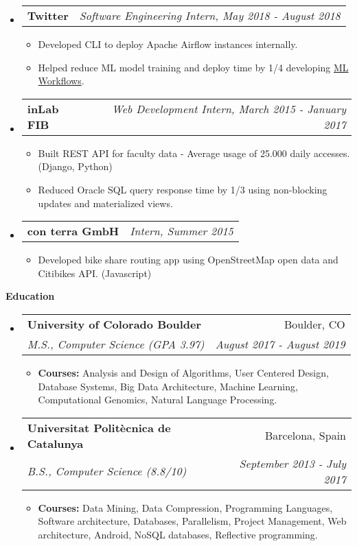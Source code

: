 \documentclass[letterpaper,10pt]{article}
\makeatletter
\newcommand{\resitem}[1]{\item #1 \vspace{-2pt}}
\newcommand{\resheading}[1]{{\large \colorbox{mygrey}{\begin{minipage}{\textwidth}{\textbf{#1 \vphantom{p\^{E}}}}\end{minipage}}}}
\newcommand{\ressubheading}[4]{
\begin{tabular*}{7.0in}{l@{\extracolsep{\fill}}r}
		\textbf{#1} & \textit{#4} \\
\end{tabular*}\vspace{-6pt}}
\newcommand{\ressubheadinged}[4]{
\begin{tabular*}{7.0in}{l@{\extracolsep{\fill}}r}
		\textbf{#1} & #2 \\
		\textit{#3} & \textit{#4}\\
\end{tabular*}\vspace{-6pt}}
\makeatother
\begin{document}
\begin{itemize}
			\item
			\ressubheading{Twitter}{Boulder, CO}{Software Engineering Intern}{Software Engineering Intern, May 2018 - August 2018}
			\begin{itemize}
				\resitem{Developed CLI to deploy Apache Airflow instances internally.}
				\resitem{Helped reduce ML model training and deploy time by 1/4 developing \href{https://blog.twitter.com/engineering/en_us/topics/insights/2018/ml-workflows.html}{ML Workflows}.}
			\end{itemize}
		\item
			\ressubheading{inLab FIB}{Barcelona, Spain}{Web Development Intern}{Web Development Intern, March 2015 - January 2017}
			\begin{itemize}
				\resitem{Built REST API for faculty data - Average usage of 25.000 daily accesses. (Django, Python)}
				\resitem{Reduced Oracle SQL query response time by 1/3 using non-blocking updates and materialized views.}
			\end{itemize}

		\item
			\ressubheading{con terra GmbH}{Münster, Germany}{Intern}{Intern, Summer 2015}
			\begin{itemize}
				\resitem{Developed bike share routing app using OpenStreetMap open data and Citibikes API. (Javascript)}
			\end{itemize}
	\end{itemize}
\break
\resheading{Education}
	\begin{itemize}
		\item
			\ressubheadinged{University of Colorado Boulder}{Boulder, CO}{M.S., Computer Science (GPA 3.97)}{August 2017 - August 2019}
			\begin{itemize}
				\resitem{\textbf{Courses:} Analysis and Design of Algorithms, User Centered Design, Database Systems, Big Data Architecture, Machine Learning, Computational Genomics, Natural Language Processing.}
			\end{itemize}

		\item
			\ressubheadinged{Universitat Polit\`ecnica de Catalunya}{Barcelona, Spain}{B.S., Computer Science (8.8/10)}{September 2013 - July 2017}
			\begin{itemize}
				\resitem{\textbf{Courses:} Data Mining, Data Compression, Programming Languages, Software architecture, Databases, Parallelism, Project Management, Web architecture, Android, NoSQL databases, Reflective programming.}
			\end{itemize}

	\end{itemize}
\end{document}
